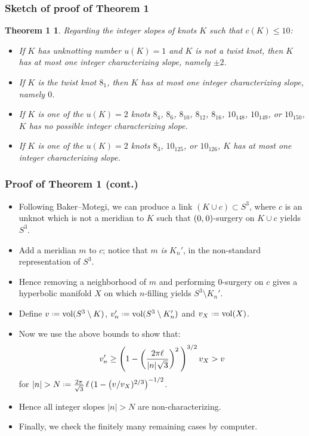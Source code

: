 \documentclass{beamer}
\newcommand{\vol}{\operatorname{vol}}
\newcommand{\defeq}{\mathrel{\vcenter{\baselineskip0.5ex\lineskiplimit0pt\hbox{\scriptsize.}\hbox{\scriptsize.}}}=}
\newcommand{\hs}{\hspace{0.05em}} %
\newtheorem{theorem1}[theorem]{Theorem 1}
\theoremstyle{ex}
\theoremstyle{rem}
\begin{document}
	\begin{frame}
		\frametitle{Sketch of proof of Theorem 1}
		\begin{theorem1}
			Regarding the integer slopes of knots $K$ such that $c(K) \leq 10$:
			\begin{itemize}
				\item If $K$ has unknotting number $u(K) = 1$ and $K$ is not a twist knot, then $K$ has at most \textit{one} integer characterizing slope, namely $\pm 2$.
				\item If $K$ is the twist knot $8_1$, then $K$ has at most \textit{one} integer characterizing slope, namely $0$.
				\item If $K$ is one of the $u(K) = 2$ knots $8_4$, $8_6$, $8_{10}$, $8_{12}$, $8_{16}$, $10_{148}$, $10_{149}$, or $10_{150}$, $K$ has no possible integer characterizing slope.
				\item If $K$ is one of the $u(K) = 2$ knots $8_3$, $10_{125}$, or $10_{126}$, $K$ has at most \textit{one} integer characterizing slope.
			\end{itemize}
		\end{theorem1}
	\end{frame}
	
	\begin{frame}
		\frametitle{Proof of Theorem 1 (cont.)}
		\begin{itemize}
			\item Following Baker--Motegi, we can produce a link $(K\cup c)\subset S^3$, where $c$ is an unknot which is not a meridian to $K$ such that $(0,\hs0)$-surgery on $K\cup c$ yields $S^3$.
			\item Add a meridian $m$ to $c$; notice that $m$ \textit{is} $K_n'$, in the non-standard representation of $S^3$.
			\item Hence removing a neighborhood of $m$ and performing $0$-surgery on $c$ gives a hyperbolic manifold $X$ on which $n$-filling yields $S^3\setminus K_n'$.
			\item Define $v\defeq\vol(S^3\setminus K)$, $v_n'\defeq\vol(S^3\setminus K_n')$ and $v_X\defeq\vol(X)$.
			\item Now we use the above bounds to show that:
			$$v_n'\ge\left(1-\left(\frac{2\pi\ell}{|n|\hs\sqrt{3}}\right)^2\,\right)^{3/2}v_X>v$$
			for $|n|>N\defeq\frac{2\pi}{\sqrt{3}}\,\ell\,(1-\left(v/v_X)^{2/3}\right)^{-1/2}$.
			\item Hence all integer slopes $|n|>N$ are non-characterizing.
			\item Finally, we check the finitely many remaining cases by computer.
		\end{itemize}
	\end{frame}
\end{document}
